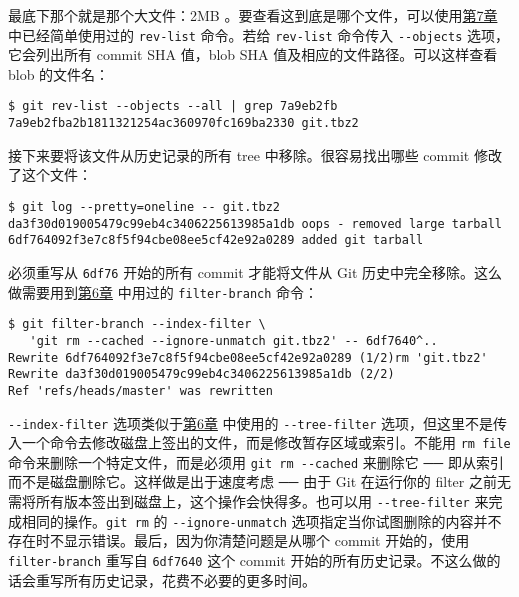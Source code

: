 \documentclass[a4paper]{book}
\newcommand{\prechap}{第}
\newcommand{\postchap}{章}
\newcommand{\chapref}[1]{\hyperref[chap:#1]{\prechap #1\postchap}}
\begin{document}
最底下那个就是那个大文件：2MB 。要查看这到底是哪个文件，可以使用\chapref{7} 中已经简单使用过的 \texttt{rev-list} 命令。若给 \texttt{rev-list} 命令传入 \texttt{-{}-objects} 选项，它会列出所有 commit SHA 值，blob SHA 值及相应的文件路径。可以这样查看 blob 的文件名：

\begin{shaded}\begin{verbatim}
$ git rev-list --objects --all | grep 7a9eb2fb
7a9eb2fba2b1811321254ac360970fc169ba2330 git.tbz2
\end{verbatim}\end{shaded}

接下来要将该文件从历史记录的所有 tree 中移除。很容易找出哪些 commit 修改了这个文件：

\begin{shaded}\begin{verbatim}
$ git log --pretty=oneline -- git.tbz2
da3f30d019005479c99eb4c3406225613985a1db oops - removed large tarball
6df764092f3e7c8f5f94cbe08ee5cf42e92a0289 added git tarball
\end{verbatim}\end{shaded}

必须重写从 \texttt{6df76} 开始的所有 commit 才能将文件从 Git 历史中完全移除。这么做需要用到\chapref{6} 中用过的 \texttt{filter-branch} 命令：

\begin{shaded}\begin{verbatim}
$ git filter-branch --index-filter \
   'git rm --cached --ignore-unmatch git.tbz2' -- 6df7640^..
Rewrite 6df764092f3e7c8f5f94cbe08ee5cf42e92a0289 (1/2)rm 'git.tbz2'
Rewrite da3f30d019005479c99eb4c3406225613985a1db (2/2)
Ref 'refs/heads/master' was rewritten
\end{verbatim}\end{shaded}

\texttt{-{}-index-filter} 选项类似于\chapref{6} 中使用的 \texttt{-{}-tree-filter} 选项，但这里不是传入一个命令去修改磁盘上签出的文件，而是修改暂存区域或索引。不能用 \texttt{rm file} 命令来删除一个特定文件，而是必须用 \texttt{git rm -{}-cached} 来删除它 ── 即从索引而不是磁盘删除它。这样做是出于速度考虑 ── 由于 Git 在运行你的 filter 之前无需将所有版本签出到磁盘上，这个操作会快得多。也可以用 \texttt{-{}-tree-filter} 来完成相同的操作。\texttt{git rm} 的 \texttt{-{}-ignore-unmatch} 选项指定当你试图删除的内容并不存在时不显示错误。最后，因为你清楚问题是从哪个 commit 开始的，使用 \texttt{filter-branch} 重写自 \texttt{6df7640} 这个 commit 开始的所有历史记录。不这么做的话会重写所有历史记录，花费不必要的更多时间。
\end{document}
